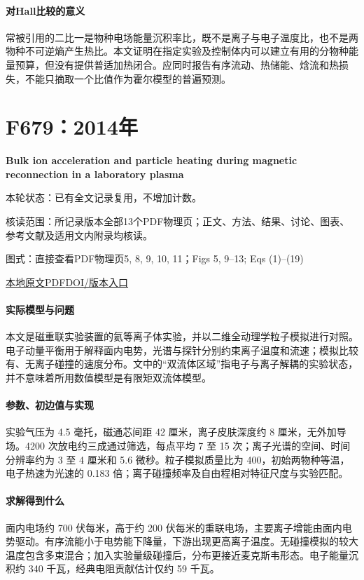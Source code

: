 \paragraph{对Hall比较的意义}常被引用的二比一是物种电场能量沉积率比，既不是离子与电子温度比，也不是两物种不可逆熵产生热比。本文证明在指定实验及控制体内可以建立有用的分物种能量预算，但没有提供普适加热闭合。应同时报告有序流动、热储能、焓流和热损失，不能只摘取一个比值作为霍尔模型的普遍预测。

\section{F679：2014年}\label{paper:F679}

\textbf{Bulk ion acceleration and particle heating during magnetic reconnection in a laboratory plasma}\citep{F679}

\textsf{本轮状态：}已有全文记录复用，不增加计数。

\textsf{核读范围：}所记录版本全部13个PDF物理页；正文、方法、结果、讨论、图表、参考文献及适用文内附录均核读。\par\textsf{图式：}直接查看PDF物理页5, 8, 9, 10, 11；Figs 5,  9–13;  Eqs (1)–(19)

\href{run:../../papers/F679.pdf}{本地原文PDF}\quad\href{https://doi.org/10.1063/1.4874331}{DOI/版本入口}

\paragraph{实际模型与问题}本文是磁重联实验装置的氦等离子体实验，并以二维全动理学粒子模拟进行对照。电子动量平衡用于解释面内电势，光谱与探针分别约束离子温度和流速；模拟比较有、无离子碰撞的速度分布。文中的“双流体区域”指电子与离子解耦的实验状态，并不意味着所用数值模型是有限矩双流体模型。

\paragraph{参数、初边值与实现}实验气压为 4.5 毫托，磁通芯间距 42 厘米，离子皮肤深度约 8 厘米，无外加导场。4200 次放电约三成通过筛选，每点平均 7 至 15 次；离子光谱的空间、时间分辨率约为 3 至 4 厘米和 5.6 微秒。粒子模拟质量比为 400，初始两物种等温，电子热速为光速的 0.183 倍；离子碰撞频率及自由程相对特征尺度与实验匹配。

\paragraph{求解得到什么}面内电场约 700 伏每米，高于约 200 伏每米的重联电场，主要离子增能由面内电势驱动。有序流能小于电势能下降量，下游出现更高离子温度。无碰撞模拟的较大温度包含多束混合；加入实验量级碰撞后，分布更接近麦克斯韦形态。电子能量沉积约 340 千瓦，经典电阻贡献估计仅约 59 千瓦。

